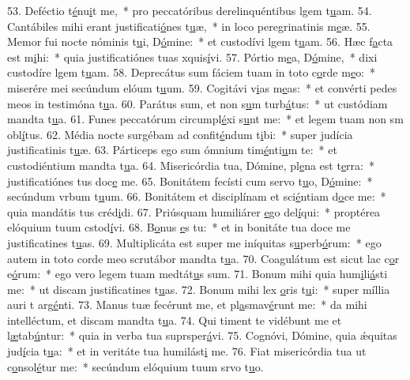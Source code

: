 53. Deféctio t\uline{é}nu\uline{i}t me,~* pro peccatóribus derelinquéntibus lgem t\uline{u}am.
54. Cantábiles mihi erant justificati\uline{ó}nes t\uline{u}æ,~* in loco peregrinatinis m\uline{e}æ.
55. Memor fui nocte nóminis t\uline{u}i, D\uline{ó}mine:~* et custodívi lgem t\uline{u}am.
56. Hæc f\uline{a}cta est m\uline{i}hi:~* quia justificatiónes tuas xquis\uline{í}vi.
57. Pórtio m\uline{e}a, D\uline{ó}mine,~* dixi custodíre lgem t\uline{u}am.
58. Deprecátus sum fáciem tuam in toto c\uline{o}rde m\uline{e}o:~* miserére mei secúndum elóum t\uline{u}um.
59. Cogitávi v\uline{i}as m\uline{e}as:~* et convérti pedes meos in testimóna t\uline{u}a.
60. Parátus sum, et non s\uline{u}m turb\uline{á}tus:~* ut custódiam mandta t\uline{u}a.
61. Funes peccatórum circumpl\uline{é}xi s\uline{u}nt me:~* et legem tuam non sm obl\uline{í}tus.
62. Média nocte surgébam ad confit\uline{é}ndum t\uline{i}bi:~* super judícia justificatinis t\uline{u}æ.
63. Párticeps ego sum ómnium tim\uline{é}nti\uline{u}m te:~* et custodiéntium mandta t\uline{u}a.
64. Misericórdia tua, Dómine, pl\uline{e}na est t\uline{e}rra:~* justificatiónes tus doc\uline{e} me.
65. Bonitátem fecísti cum servo t\uline{u}o, D\uline{ó}mine:~* secúndum vrbum t\uline{u}um.
66. Bonitátem et disciplínam et sci\uline{é}ntiam d\uline{o}ce me:~* quia mandátis tus créd\uline{i}di.
67. Priúsquam humiliárer \uline{e}go del\uline{í}qui:~* proptérea elóquium tuum cstod\uline{í}vi.
68. B\uline{o}nus \uline{e}s tu:~* et in bonitáte tua doce me justificatines t\uline{u}as.
69. Multiplicáta est super me iníquitas s\uline{u}perb\uline{ó}rum:~* ego autem in toto corde meo scrutábor mandta t\uline{u}a.
70. Coagulátum est sicut lac c\uline{o}r e\uline{ó}rum:~* ego vero legem tuam medtát\uline{u}s sum.
71. Bonum mihi quia hum\uline{i}li\uline{á}sti me:~* ut discam justificatines t\uline{u}as.
72. Bonum mihi lex \uline{o}ris t\uline{u}i:~* super míllia auri t arg\uline{é}nti.
73. Manus tuæ fecérunt me, et pl\uline{a}smav\uline{é}runt me:~* da mihi intelléctum, et discam mandta t\uline{u}a.
74. Qui timent te vidébunt me et l\uline{æ}tab\uline{ú}ntur:~* quia in verba tua suprsper\uline{á}vi.
75. Cognóvi, Dómine, quia ǽquitas jud\uline{í}cia t\uline{u}a:~* et in veritáte tua humilást\uline{i} me.
76. Fiat misericórdia tua ut c\uline{o}nsol\uline{é}tur me:~* secúndum elóquium tuum srvo t\uline{u}o.
